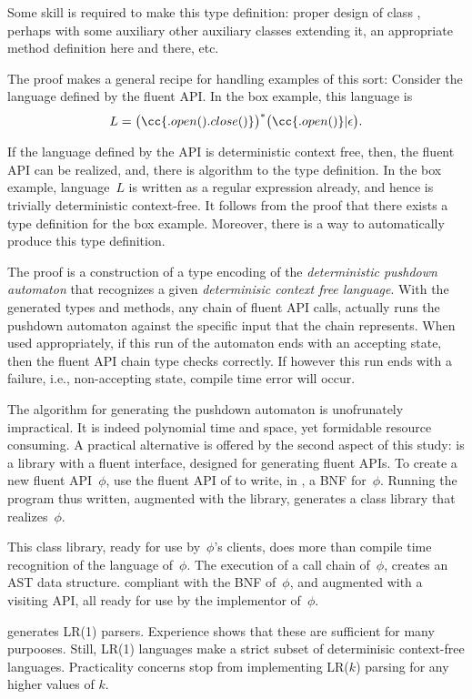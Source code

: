 Some skill is required to make this type definition: proper design of class , perhaps with
  some auxiliary other auxiliary classes extending it, an appropriate method definition here and there, etc.

The proof makes a general recipe for handling examples of this sort:
Consider the language defined by the fluent API.
In the box example, this language is
\[
  L = \big(\cc{.open().close()}\big)^*\big(\cc{.open()}|\epsilon\big).
\]

If the language defined by the API is deterministic context free, then, 
  the fluent API can be realized, and,
  there is algorithm to the type definition.
In the box example, language~$L$ is written as a regular expression already,
  and hence is trivially deterministic context-free.
It follows from the proof that there exists a type definition
  for the box example.
Moreover, there is a way
  to automatically produce this type definition.

The proof is a construction of a \Java type encoding of
  the \emph{deterministic pushdown automaton} that recognizes
  a given \emph{determinisic context free language}.
With the generated types and methods, any chain of fluent API calls,
  actually runs the pushdown automaton against the specific input that the chain represents.
When used appropriately, if this run of the automaton ends with an accepting state,
  then the fluent API chain type checks correctly.
If however this run ends with a failure, i.e., non-accepting state,
  compile time error will occur.

The algorithm for generating the pushdown automaton is unofrunately impractical.
It is indeed polynomial time and space,
  yet formidable resource consuming.
A practical alternative is offered by the second aspect of this study:
\Self is a \Java library with a fluent interface, designed for generating fluent APIs.
To create a new fluent API~$ϕ$, use the fluent API of \Self to write, in \Java, a BNF for~$ϕ$.
Running the \Java program thus written, augmented with the \Self library,
  generates a \Java class library that realizes~$ϕ$.

This class library, ready for use by~$ϕ$'s clients, does more 
  than compile time recognition
  of the language of~$ϕ$.
The execution of a call chain of~$ϕ$, creates an AST data structure.
  compliant with the BNF of~$ϕ$, and augmented with a visiting API, all ready
  for use by the implementor of~$ϕ$.

\Self generates LR(1) parsers. Experience shows that these are 
  sufficient for many purpooses. 
Still, LR(1) languages make a strict subset of determinisic context-free languages. 
Practicality concerns stop \Self from implementing LR($k$) parsing for any 
  higher values of $k$.

